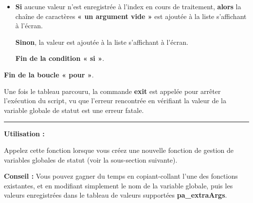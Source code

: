 \documentclass[a4paper,10pt]{article}
\begin{document}
    \begin{itemize}
        \item
        {
            \begin{justify}
                \textbf{\color{cond}Si} aucune valeur n'est enregistrée à l'index en cours de traitement, \textbf{\color{cond}alors} la chaîne de caractères \textbf{« un argument vide »} est ajoutée à la liste s'affichant à l'écran.
            \end{justify}

            \setlength{\parskip}{1em}

            \begin{justify}
                \textbf{\color{cond}Sinon}, la valeur est ajoutée à la liste s'affichant à l'écran.
            \end{justify}

            \begin{justify}
                \textbf{\color{cond} Fin de la condition « si »}.
            \end{justify}
        }
    \end{itemize}

    \begin{justify}
        \textbf{\color{loop} Fin de la boucle « pour »}.
    \end{justify}

    \setlength{\parskip}{2em}

    \begin{justify}
        Une fois le tableau parcouru, la commande \textbf{\color{cmds}exit} est appelée pour arrêter l'exécution du script, vu que l'erreur rencontrée en vérifiant la valeur de la variable globale de statut est une erreur fatale.
    \end{justify}


    \setlength{\parskip}{1em}


    \par\noindent\rule{\textwidth}{0.4pt}

    \begin{justify}
        \textbf{Utilisation :}

        Appelez cette fonction lorsque vous créez une nouvelle fonction de gestion de variables globales de statut (voir la sous-section suivante).
    \end{justify}

    \begin{justify}
        \textbf{Conseil :} Vous pouvez gagner du temps en copiant-collant l'une des fonctions existantes, et en modifiant simplement le nom de la variable globale, puis les valeurs enregistrées dans le tableau de valeurs supportées \textbf{\color{vars}pa\_extraArgs}.
    \end{justify}
\end{document}
